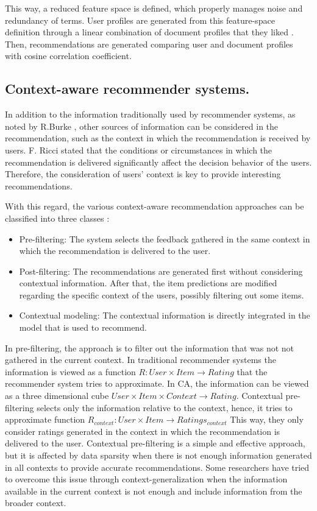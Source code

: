 \documentclass[preprint]{elsarticle}
\begin{document}
\begin{spacing}{1.5}
This way, a reduced feature space is defined, which properly manages noise and redundancy of terms. User profiles are generated from this feature-space definition through a linear combination of document profiles that they liked \cite{Bambini2011}. Then, recommendations are generated comparing user and document profiles with cosine correlation coefficient.

\subsection{Context-aware recommender systems.}

In addition to the information traditionally used by recommender systems, as noted by R.Burke \cite{Burke2002}, other sources of information can be considered in the recommendation, such as the context in which the recommendation is received by users. F. Ricci \cite{Ricci2012contextualizing} stated that the conditions or circumstances in which the recommendation is delivered significantly affect the decision behavior of the users. Therefore, the consideration of users' context is key to provide interesting recommendations.

With this regard, the various context-aware recommendation approaches can be classified into three classes \cite{Adomavicius2011}:
\begin{itemize}
	\item Pre-filtering: The system selects the feedback gathered in the same context in which the recommendation is delivered to the user.
	\item Post-filtering: The recommendations are generated first without considering contextual information. After that, the item predictions are modified regarding the specific context of the users, possibly filtering out some items.
	\item Contextual modeling: The contextual information is directly integrated in the model that is used to recommend.
\end{itemize}

In pre-filtering, the approach is to filter out the information that was not not gathered in the current context. In traditional recommender systems the information is viewed as a function $R: User \times Item \rightarrow Rating $ that the recommender system tries to approximate. In CA, the information can be viewed as a three dimensional cube $User \times Item \times Context \rightarrow Rating$. Contextual pre-filtering selects only the information relative to the context, hence, it tries to approximate function $R_{context}: User \times Item \rightarrow Ratings_{context}$ This way, they only consider ratings generated in the context in which the recommendation is delivered to the user. Contextual pre-filtering is a simple and effective approach, but it is affected by data sparsity when there is not enough information generated in all contexts to provide accurate recommendations. Some researchers have tried to overcome this issue through context-generalization \cite{Adomavicius2011} when the information available in the current context is not enough and include information from the broader context.


\end{spacing}
\end{document}
